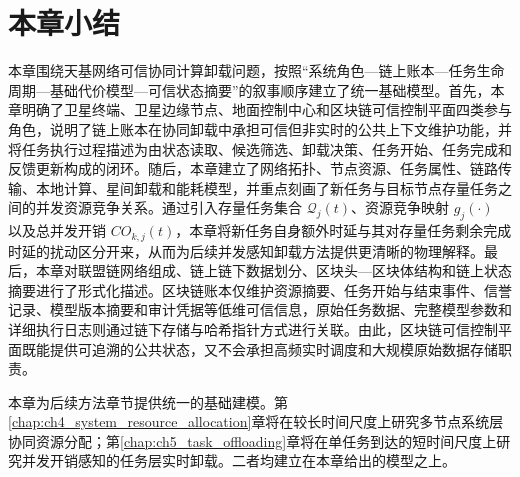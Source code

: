 \section{本章小结}
\label{sec:ch3_summary}

本章围绕天基网络可信协同计算卸载问题，按照``系统角色—链上账本—任务生命周期—基础代价模型—可信状态摘要''的叙事顺序建立了统一基础模型。首先，本章明确了卫星终端、卫星边缘节点、地面控制中心和区块链可信控制平面四类参与角色，说明了链上账本在协同卸载中承担可信但非实时的公共上下文维护功能，并将任务执行过程描述为由状态读取、候选筛选、卸载决策、任务开始、任务完成和反馈更新构成的闭环。随后，本章建立了网络拓扑、节点资源、任务属性、链路传输、本地计算、星间卸载和能耗模型，并重点刻画了新任务与目标节点存量任务之间的并发资源竞争关系。通过引入存量任务集合 $\mathcal{Q}_j(t)$、资源竞争映射 $g_j(\cdot)$ 以及总并发开销 $CO_{k,j}(t)$，本章将新任务自身额外时延与其对存量任务剩余完成时延的扰动区分开来，从而为后续并发感知卸载方法提供更清晰的物理解释。最后，本章对联盟链网络组成、链上链下数据划分、区块头—区块体结构和链上状态摘要进行了形式化描述。区块链账本仅维护资源摘要、任务开始与结束事件、信誉记录、模型版本摘要和审计凭据等低维可信信息，原始任务数据、完整模型参数和详细执行日志则通过链下存储与哈希指针方式进行关联。由此，区块链可信控制平面既能提供可追溯的公共状态，又不会承担高频实时调度和大规模原始数据存储职责。

本章为后续方法章节提供统一的基础建模。第\ref{chap:ch4_system_resource_allocation}章将在较长时间尺度上研究多节点系统层协同资源分配；第\ref{chap:ch5_task_offloading}章将在单任务到达的短时间尺度上研究并发开销感知的任务层实时卸载。二者均建立在本章给出的模型之上。
